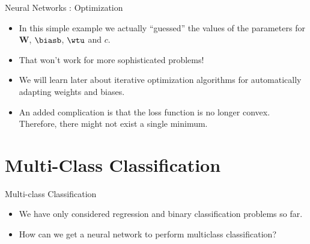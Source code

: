\begin{frame} {Neural Networks : Optimization}
  \begin{itemize}
    \item In this simple example we actually \enquote{guessed} the values of the parameters for $\textbf{W}$, $\biasb$, $\wtu$ and $c$.
    \vspace{3mm}
    \item That won't work for more sophisticated problems!
    \vspace{3mm}
    \item We will learn later about iterative optimization algorithms for automatically adapting weights and biases.
    \vspace{3mm}
    \item An added complication is that the loss function is no longer convex. Therefore, there might not exist a single minimum. 
  \end{itemize}
\end{frame}


\section{Multi-Class Classification}


\begin{frame} {Multi-class Classification}
\vspace{20mm}
\begin{itemize}
\item We have only considered regression and binary classification problems so far.
\vspace{5mm}
\item How can we get a neural network to perform multiclass classification?
  \end{itemize}
\end{frame}

